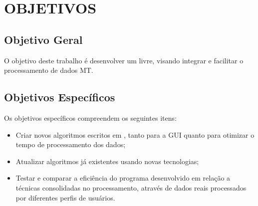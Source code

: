 \chapter{OBJETIVOS}

	\section{Objetivo Geral}
        O objetivo deste trabalho é desenvolver um  livre, visando integrar e facilitar o processamento de dados MT.
    
    \section{Objetivos Específicos}
        
        Os objetivos específicos compreendem os seguintes itens:
        
        \begin{itemize}
            \item Criar novos algoritmos escritos em \Python, tanto para a GUI quanto para otimizar o tempo de processamento dos dados;
            \item Atualizar algoritmos já existentes usando novas tecnologias;
            \item Testar e comparar a eficiência do programa desenvolvido em relação a técnicas consolidadas no processamento, através de dados reais processados por diferentes perfis de usuários.
        \end{itemize}
